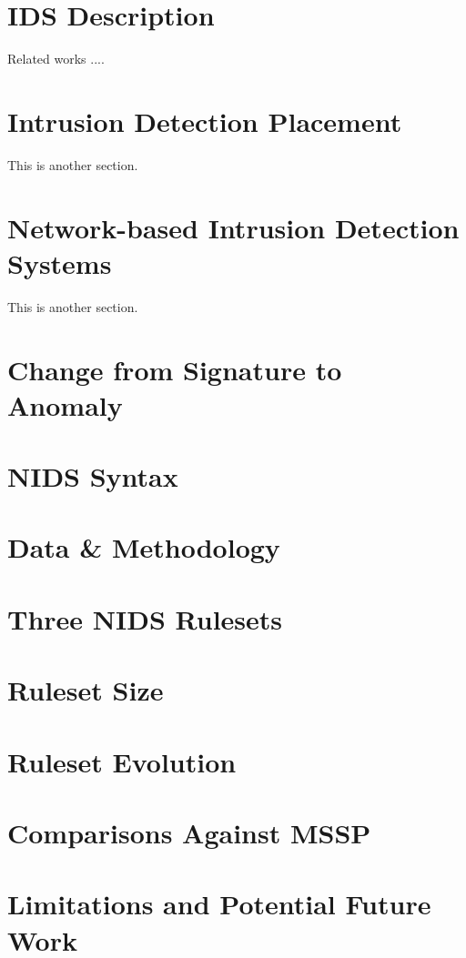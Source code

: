 \section{IDS Description}
\label{sec:related}

Related works .... 



\section{Intrusion Detection Placement}

This is another section. 

\section{Network-based Intrusion Detection Systems}

This is another section. 

\section{Change from Signature to Anomaly}
\section{NIDS Syntax}
\section{Data & Methodology}
\section{Three NIDS Rulesets}
\section{Ruleset Size}
\section{Ruleset Evolution}
\section{Comparisons Against MSSP}
\section{Limitations and Potential Future Work}